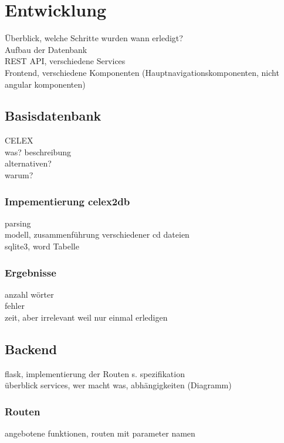 \section{Entwicklung}

Überblick, welche Schritte wurden wann erledigt?\\
Aufbau der Datenbank\\
REST API, verschiedene Services\\
Frontend, verschiedene Komponenten (Hauptnavigationskomponenten, nicht angular komponenten)\\

\subsection{Basisdatenbank}

CELEX\\
was? beschreibung\\
alternativen?\\
warum?

\subsubsection{Impementierung celex2db}

parsing\\
modell, zusammenführung verschiedener cd dateien\\
sqlite3, word Tabelle\\

\subsubsection{Ergebnisse}

anzahl wörter\\
fehler\\
zeit, aber irrelevant weil nur einmal erledigen


\subsection{Backend}

flask, implementierung der Routen s. spezifikation\\
überblick services, wer macht was, abhängigkeiten (Diagramm)\\

\subsubsection{Routen}
angebotene funktionen, routen mit parameter namen

